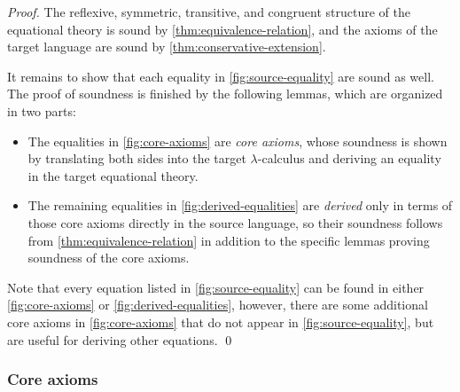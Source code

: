 \thmsoundness*
\begin{proof}
  The reflexive, symmetric, transitive, and congruent structure of the equational theory is sound by \cref{thm:equivalence-relation}, and the axioms of the target language are sound by \cref{thm:conservative-extension}.

  It remains to show that each equality in \cref{fig:source-equality} are sound as well.
  The proof of soundness is finished by the following lemmas, which are organized in two parts:
  \begin{itemize}
  \item The equalities in \cref{fig:core-axioms} are \emph{core axioms}, whose soundness is shown by translating both sides into the target $\lambda$-calculus and deriving an equality in the target equational theory.
  \item The remaining equalities in \cref{fig:derived-equalities} are \emph{derived} only in terms of those core axioms directly in the source language, so their soundness follows from \cref{thm:equivalence-relation} in addition to the specific lemmas proving soundness of the core axioms.
  \end{itemize}
  Note that every equation listed in \cref{fig:source-equality} can be found in either \cref{fig:core-axioms} or \cref{fig:derived-equalities}, however, there are some additional core axioms in \cref{fig:core-axioms} that do not appear in \cref{fig:source-equality}, but are useful for deriving other equations.
  \qed
\end{proof}

\subsubsection{Core axioms}

